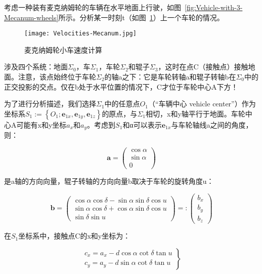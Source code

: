考虑一种装有麦克纳姆轮的车辆在水平地面上行驶，如图~\ref{fig:Vehicle-with-3-Mecanum-wheels}所示。分析某一时刻t（如图~\ref{fig:Velocities-Mecanum}）上一个车轮的情况。

\begin{figure}[htbp]
    \centering
    \texttt{[image: Velocities-Mecanum.jpg]}
    \caption{麦克纳姆轮小车速度计算}
    \label{fig:Velocities-Mecanum}
\end{figure}

涉及四个系统：地面$\Sigma_{0}$，车$\Sigma_{1}$，车轮$\Sigma_{2}$和辊子$\Sigma_{3}$，这时在点C（接触点）接触地面。注意，该点始终位于车轮$\Sigma_{2}$的轴a之下：它是车轮转轴a和辊子转轴b在$\Sigma_{0}$中的正交投影的交点。仅在b处于水平位置的情况下，C才位于车轮中心A下方！

为了进行分析描述，我们选择$\Sigma_{1}$中的任意点$O_{1}$（“车辆中心 vehicle center”）作为坐标系$S_{1}:=\left\{O_{1} ; \mathbf{e}_{1 x}, \mathbf{e}_{1 y}, \mathbf{e}_{1 z}\right\}$的原点，与$\Sigma_{1}$相切，x和y轴平行于地面。车轮中心A可能有x和y坐标$a_x$和$a_y$。考虑到$S_1$和α可以表示$\mathbf{e}_{1 x}$与车轮轴线a之间的角度，则：

\begin{equation}
    \mathbf{a}=\left(\begin{array}{c}
    {\cos \alpha} \\
    {\sin \alpha} \\
    {0}
    \end{array}\right)
\end{equation}

是a轴的方向向量，辊子转轴的方向向量b取决于车轮的旋转角度u：

\begin{equation}
    \mathbf{b}=\left(\begin{array}{c}
    {\cos \alpha \cos \delta-\sin \alpha \sin \delta \cos u} \\
    {\sin \alpha \cos \delta+\cos \alpha \sin \delta \cos u} \\
    {\sin \delta \sin u}
    \end{array}\right)=:\left(\begin{array}{l}
    {b_{x}} \\
    {b_{y}} \\
    {b_{z}}
    \end{array}\right)
\end{equation}

在$S_1$坐标系中，接触点C的x和y坐标为：

\begin{equation}
    \left.\begin{array}{l}
    {c_{x}=a_{x}-d \cos \alpha \cot \delta \tan u} \\
    {c_{y}=a_{y}-d \sin \alpha \cot \delta \tan u}
    \end{array}\right\}
\end{equation}


